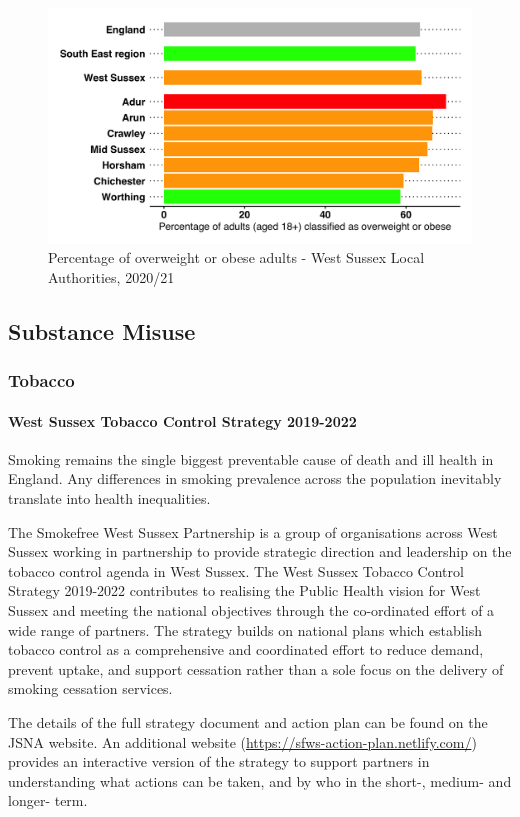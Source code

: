 \begin{figure}[h]
    \caption{Percentage of overweight or obese adults - West Sussex Local Authorities, 2020/21}\label{fig:obesity:rag}
    \centering
    \includegraphics[width=\linewidth]{images/obesity_rag_bar.png}
\end{figure}

\subsection{Substance Misuse}
\subsubsection{Tobacco}
\paragraph{West Sussex Tobacco Control Strategy 2019-2022} Smoking remains the single biggest preventable cause of death and ill health in England. Any differences in smoking prevalence across the population inevitably translate into health inequalities.

The Smokefree West Sussex Partnership is a group of organisations across West Sussex working in partnership to provide strategic direction and leadership on the tobacco control agenda in West Sussex. The West Sussex Tobacco Control Strategy 2019-2022 contributes to realising the Public Health vision for West Sussex and meeting the national objectives through the co-ordinated effort of a wide range of partners. The strategy builds on national plans which establish tobacco control as a comprehensive and coordinated effort to reduce demand, prevent uptake, and support cessation rather than a sole focus on the delivery of smoking cessation services.

The details of the full strategy document and action plan can be found on the JSNA website. An additional website (\url{https://sfws-action-plan.netlify.com/}) provides an interactive version of the strategy to support partners in understanding what actions can be taken, and by who in the short-, medium- and longer- term. 

